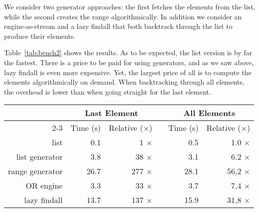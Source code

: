 \documentclass{new_tlp}
\begin{document}
We consider two generator approaches: the first fetches the elements from the
list, while the second creates the range algorithmically. In addition we
consider an engine-as-stream and a lazy findall that both backtrack through the
list to produce their elements.

Table~\ref{tab:bench2} shows the results. As to be expected, the list version
is by far the fastest. There is a price to be paid for using generators, and as
we saw above, lazy findall is even more expensive. Yet, the largest price of
all is to compute the elements algorithmically on demand. When backtracking
through all elements, the overhead is lower than when going straight
for the last element.

\begin{table*}\centering
{}
\begin{tabular}{@{}rrrlrr@{}}
\toprule
& \multicolumn{2}{c}{Last Element} & \phantom{abc} & \multicolumn{2}{c}{All Elements}\\
\cmidrule{2-3}\cmidrule{5-6}
& Time (s) & Relative ($\times$) & & Time (s) & Relative ($\times$)  \\
\midrule
list             &   0.1 &   1 $\times$ & &  0.5 &   1.0 $\times$  \\
list generator   &   3.8 &  38 $\times$ & &  3.1 &   6.2 $\times$  \\ 
range generator  &  26.7 & 277 $\times$ & & 28.1 &  56,2 $\times$  \\ 
OR engine        &   3.3 &  33 $\times$ & &  3.7 &   7,4 $\times$  \\
lazy findall     &  13.7 & 137 $\times$ & & 15.9 &  31,8 $\times$  \\
\bottomrule
\end{tabular}
\caption{Benchmark results for processing a stream of $2^{23}$ elements.}\label{tab:bench2}
\end{table*}
\end{document}
